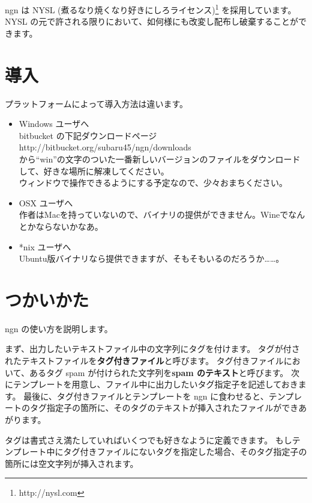 \documentclass[a4j]{jsarticle}
\begin{document}
ngn は NYSL (煮るなり焼くなり好きにしろライセンス)\footnote{http://nysl.com} を採用しています。
NYSL の元で許される限りにおいて、如何様にも改変し配布し破棄することができます。


\section{導入}

プラットフォームによって導入方法は違います。

\begin{itemize}
\item Windows ユーザへ\\
  bitbucket の下記ダウンロードページ \\
  http://bitbucket.org/subaru45/ngn/downloads \\
から``win''の文字のついた一番新しいバージョンのファイルをダウンロードして、好きな場所に解凍してください。\\
  ウィンドウで操作できるようにする予定なので、少々おまちください。\\

\item OSX ユーザへ\\
  作者はMacを持っていないので、バイナリの提供ができません。Wineでなんとかならないかなあ。

\item *nix ユーザへ\\
  Ubuntu版バイナリなら提供できますが、そもそもいるのだろうか……。

\end{itemize}



\section{つかいかた}
ngn の使い方を説明します。

まず、出力したいテキストファイル中の文字列にタグを付けます。
タグが付されたテキストファイルを\textbf{タグ付きファイル}と呼びます。
タグ付きファイルにおいて、あるタグ spam が付けられた文字列を\textbf{spam のテキスト}と呼びます。
次にテンプレートを用意し、ファイル中に出力したいタグ指定子を記述しておきます。
最後に、タグ付きファイルとテンプレートを ngn に食わせると、テンプレートのタグ指定子の箇所に、そのタグのテキストが挿入されたファイルができあがります。

タグは書式さえ満たしていればいくつでも好きなように定義できます。
もしテンプレート中にタグ付きファイルにないタグを指定した場合、そのタグ指定子の箇所には空文字列が挿入されます。
\end{document}
